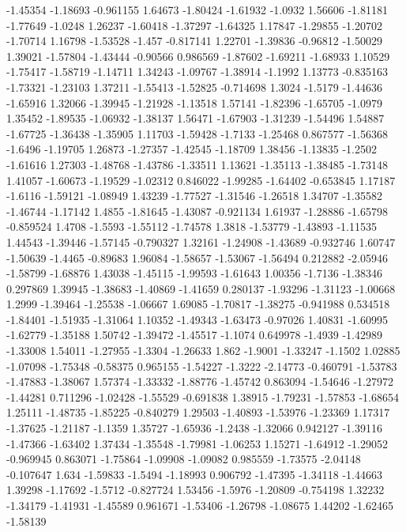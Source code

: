 \documentclass[9pt]{article}
\theoremstyle{plain}
\theoremstyle{definition}
\theoremstyle{remark}
\numberwithin{equation}{section}
\begin{document}
-1.45354
-1.18693
-0.961155
1.64673
-1.80424
-1.61932
-1.0932
1.56606
-1.81181
-1.77649
-1.0248
1.26237
-1.60418
-1.37297
-1.64325
1.17847
-1.29855
-1.20702
-1.70714
1.16798
-1.53528
-1.457
-0.817141
1.22701
-1.39836
-0.96812
-1.50029
1.39021
-1.57804
-1.43444
-0.90566
0.986569
-1.87602
-1.69211
-1.68933
1.10529
-1.75417
-1.58719
-1.14711
1.34243
-1.09767
-1.38914
-1.1992
1.13773
-0.835163
-1.73321
-1.23103
1.37211
-1.55413
-1.52825
-0.714698
1.3024
-1.5179
-1.44636
-1.65916
1.32066
-1.39945
-1.21928
-1.13518
1.57141
-1.82396
-1.65705
-1.0979
1.35452
-1.89535
-1.06932
-1.38137
1.56471
-1.67903
-1.31239
-1.54496
1.54887
-1.67725
-1.36438
-1.35905
1.11703
-1.59428
-1.7133
-1.25468
0.867577
-1.56368
-1.6496
-1.19705
1.26873
-1.27357
-1.42545
-1.18709
1.38456
-1.13835
-1.2502
-1.61616
1.27303
-1.48768
-1.43786
-1.33511
1.13621
-1.35113
-1.38485
-1.73148
1.41057
-1.60673
-1.19529
-1.02312
0.846022
-1.99285
-1.64402
-0.653845
1.17187
-1.6116
-1.59121
-1.08949
1.43239
-1.77527
-1.31546
-1.26518
1.34707
-1.35582
-1.46744
-1.17142
1.4855
-1.81645
-1.43087
-0.921134
1.61937
-1.28886
-1.65798
-0.859524
1.4708
-1.5593
-1.55112
-1.74578
1.3818
-1.53779
-1.43893
-1.11535
1.44543
-1.39446
-1.57145
-0.790327
1.32161
-1.24908
-1.43689
-0.932746
1.60747
-1.50639
-1.4465
-0.89683
1.96084
-1.58657
-1.53067
-1.56494
0.212882
-2.05946
-1.58799
-1.68876
1.43038
-1.45115
-1.99593
-1.61643
1.00356
-1.7136
-1.38346
0.297869
1.39945
-1.38683
-1.40869
-1.41659
0.280137
-1.93296
-1.31123
-1.00668
1.2999
-1.39464
-1.25538
-1.06667
1.69085
-1.70817
-1.38275
-0.941988
0.534518
-1.84401
-1.51935
-1.31064
1.10352
-1.49343
-1.63473
-0.97026
1.40831
-1.60995
-1.62779
-1.35188
1.50742
-1.39472
-1.45517
-1.1074
0.649978
-1.4939
-1.42989
-1.33008
1.54011
-1.27955
-1.3304
-1.26633
1.862
-1.9001
-1.33247
-1.1502
1.02885
-1.07098
-1.75348
-0.58375
0.965155
-1.54227
-1.3222
-2.14773
-0.460791
-1.53783
-1.47883
-1.38067
1.57374
-1.33332
-1.88776
-1.45742
0.863094
-1.54646
-1.27972
-1.44281
0.711296
-1.02428
-1.55529
-0.691838
1.38915
-1.79231
-1.57853
-1.68654
1.25111
-1.48735
-1.85225
-0.840279
1.29503
-1.40893
-1.53976
-1.23369
1.17317
-1.37625
-1.21187
-1.1359
1.35727
-1.65936
-1.2438
-1.32066
0.942127
-1.39116
-1.47366
-1.63402
1.37434
-1.35548
-1.79981
-1.06253
1.15271
-1.64912
-1.29052
-0.969945
0.863071
-1.75864
-1.09908
-1.09082
0.985559
-1.73575
-2.04148
-0.107647
1.634
-1.59833
-1.5494
-1.18993
0.906792
-1.47395
-1.34118
-1.44663
1.39298
-1.17692
-1.5712
-0.827724
1.53456
-1.5976
-1.20809
-0.754198
1.32232
-1.34179
-1.41931
-1.45589
0.961671
-1.53406
-1.26798
-1.08675
1.44202
-1.62465
-1.58139
\end{document}
